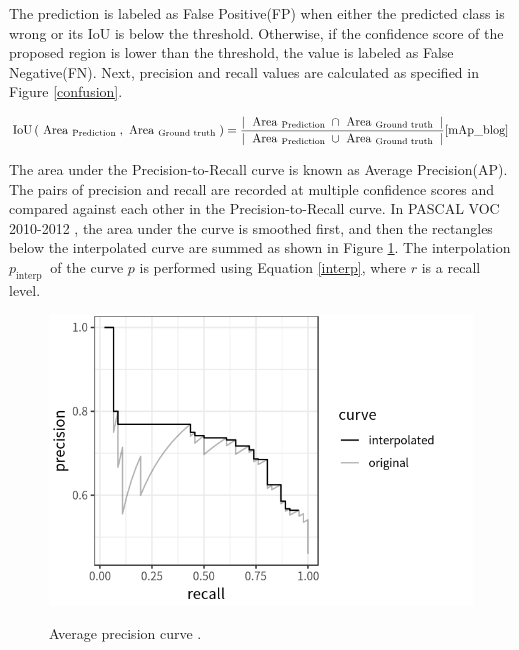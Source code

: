 The prediction is labeled as False Positive(FP) when either the predicted class is wrong or its IoU is below the threshold. Otherwise, if the confidence score of the proposed region is lower than the threshold, the value is labeled as False Negative(FN). Next, precision and recall values are calculated as specified in Figure \ref{confusion}.

\begin{equation}
\operatorname{IoU}\left(\text { Area }_{\text {Prediction }}, \text { Area }_{\text {Ground truth }}\right)=\frac{\mid \text { Area }_{\text {Prediction }} \cap \text { Area }_{\text {Ground truth }} \mid}{\mid \text { Area }_{\text {Prediction }} \cup \text { Area }_{\text {Ground truth }} \mid}
\label{iou} 
\cite{mAp_blog} 
\end{equation}

The area under the Precision-to-Recall curve is known as Average Precision(AP). The pairs of precision and recall are recorded at multiple confidence scores and compared against each other in the Precision-to-Recall curve. In PASCAL VOC 2010-2012 \cite{Everingham10}, the area under the curve is smoothed first, and then the rectangles below the interpolated curve are summed as shown in Figure \ref{AUC}. The interpolation $p_{\text {interp }}$ of the curve $p$ is performed using Equation \ref{interp}, where $r$ is a recall level. 

\begin{figure}[htb]
	\begin{center}
		\includegraphics[width=12cm]{./AUC.png}
	\end{center}
	\caption{Average precision curve \cite{mAp_blog}.}
	\begin{center}
		\label{AUC}
	\end{center}
\end{figure}
\FloatBarrier


